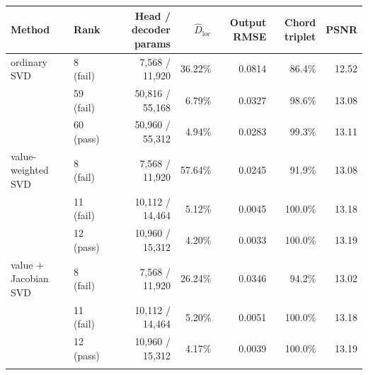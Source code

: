 \begin{tabular}{llrrrrr}
\toprule
Method & Rank & Head / decoder params & $\widehat D_{\mathrm{loc}}$ & Output RMSE & Chord triplet & PSNR \\
\midrule
ordinary SVD & 8 (fail) & 7,568 / 11,920 & 36.22\% & 0.0814 & 86.4\% & 12.52 \\
 & 59 (fail) & 50,816 / 55,168 & 6.79\% & 0.0327 & 98.6\% & 13.08 \\
 & 60 (pass) & 50,960 / 55,312 & 4.94\% & 0.0283 & 99.3\% & 13.11 \\
\addlinespace
value-weighted SVD & 8 (fail) & 7,568 / 11,920 & 57.64\% & 0.0245 & 91.9\% & 13.08 \\
 & 11 (fail) & 10,112 / 14,464 & 5.12\% & 0.0045 & 100.0\% & 13.18 \\
 & 12 (pass) & 10,960 / 15,312 & 4.20\% & 0.0033 & 100.0\% & 13.19 \\
\addlinespace
value + Jacobian SVD & 8 (fail) & 7,568 / 11,920 & 26.24\% & 0.0346 & 94.2\% & 13.02 \\
 & 11 (fail) & 10,112 / 14,464 & 5.20\% & 0.0051 & 100.0\% & 13.18 \\
 & 12 (pass) & 10,960 / 15,312 & 4.17\% & 0.0039 & 100.0\% & 13.19 \\
\addlinespace
\bottomrule
\end{tabular}
